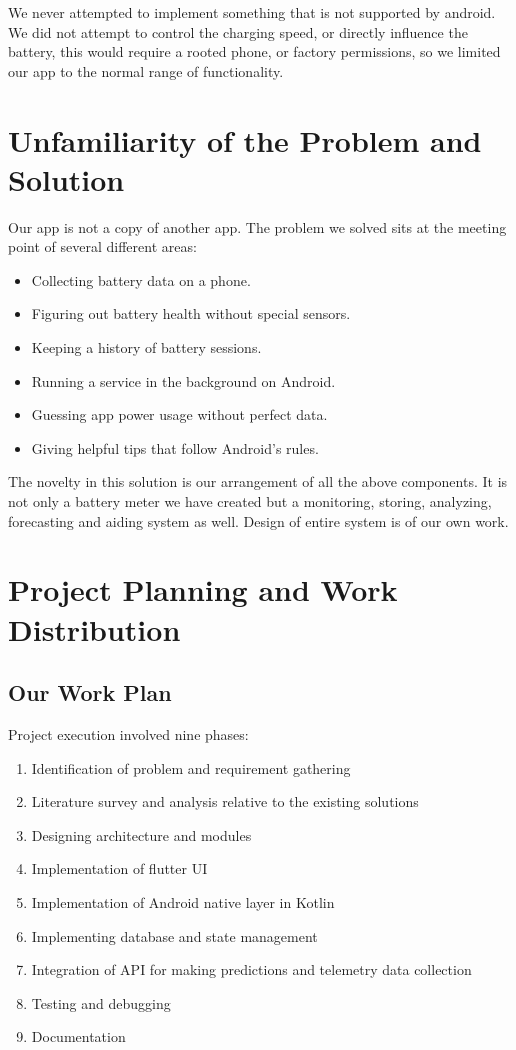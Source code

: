 \documentclass[12pt,a4paper]{report}
\begin{document}
We never attempted to implement something that is not supported by android. We did not attempt to control the charging speed, or directly influence the battery, this would require a rooted phone, or factory permissions, so we limited our app to the normal range of functionality.

\section{Unfamiliarity of the Problem and Solution}

Our app is not a copy of another app. The problem we solved sits at the meeting point of several different areas:

\begin{itemize}
    \item Collecting battery data on a phone.
    \item Figuring out battery health without special sensors.
    \item Keeping a history of battery sessions.
    \item Running a service in the background on Android.
    \item Guessing app power usage without perfect data.
    \item Giving helpful tips that follow Android's rules.
\end{itemize}

The novelty in this solution is our arrangement of all the above components. It is not only a battery meter we have created but a monitoring, storing, analyzing, forecasting and aiding system as well. Design of entire system is of our own work.

\section{Project Planning and Work Distribution}

\subsection{Our Work Plan}

Project execution involved nine phases:
\begin{enumerate}
  \item Identification of problem and requirement gathering
  \item Literature survey and analysis relative to the existing solutions
  \item Designing architecture and modules
  \item Implementation of flutter UI
  \item Implementation of Android native layer in Kotlin
  \item Implementing database and state management
  \item Integration of API for making predictions and telemetry data collection
  \item Testing and debugging
  \item Documentation
\end{enumerate}
\end{document}
